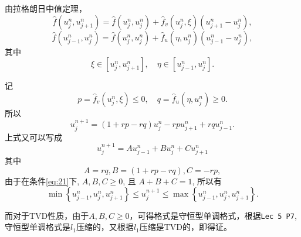 \documentclass[12pt]{article}
\begin{document}
由拉格朗日中值定理，
\begin{equation}
	\hat{f}\left(u_{j}^{n}, u_{j+1}^{n}\right) = \hat{f}\left(u_{j}^{n}, u_{j}^{n}\right)+\hat{f}_v\left(u_{j}^{n}, \xi \right) \left(u_{j+1}^{n} - u_{j}^{n}\right),
\end{equation}
\begin{equation}
	\hat{f}\left(u_{j-1}^{n}, u_{j}^{n}\right) = \hat{f}\left(u_{j}^{n}, u_{j}^{n}\right)+\hat{f}_u \left(\eta, u_{j}^{n} \right) \left(u_{j-1}^{n} - u_{j}^{n}\right),
\end{equation}
其中
\begin{equation}
	\xi \in \left[u_{j}^{n}, u_{j+1}^{n}\right],\quad \eta \in \left[u_{j-1}^{n}, u_{j}^{n}\right].
\end{equation}

记
\begin{equation}
	p = \hat{f}_v\left(u_{j}^{n}, \xi \right) \leq 0,\quad q = \hat{f}_u \left(\eta, u_{j}^{n} \right)\geq 0.
\end{equation}
所以
\begin{equation}
	u_j^{n+1}=(1+rp-rq)u^n_j-rpu_{j+1}^n+rqu_{j-1}^n.
	\label{eq:22}
\end{equation}
上式又可以写成
\begin{equation}
	u_{j}^{n+1}=A u_{j-1}^{n}+B u_{j}^{n}+C u_{j+1}^{n}
\end{equation}
其中
\begin{equation}
	A=rq, B=(1+rp-rq), C=-rp,
\end{equation}
由于在条件\cref{eq:21}下, $A, B, C \geq 0$, 且 $A+B+C=1$, 所以有
\begin{equation}
	\min \left\{u_{j-1}^{n}, u_{j}^{n}, u_{j+1}^{n}\right\} \leq u_{j}^{n+1} \leq \max \left\{u_{j-1}^{n}, u_{j}^{n}, u_{j+1}^{n}\right\}.
\end{equation}

而对于TVD性质，由于$A, B, C \geq 0$，可得格式是守恒型单调格式，根据\texttt{Lec 5 P7},守恒型单调格式是$l_1$压缩的，又根据$l_1$压缩是TVD的，即得证。
\end{document}
